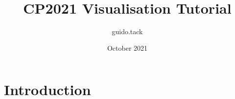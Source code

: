 \documentclass{article}
\title{CP2021 Visualisation Tutorial}
\author{guido.tack }
\date{October 2021}
\begin{document}
\maketitle

\section{Introduction}
\end{document}
